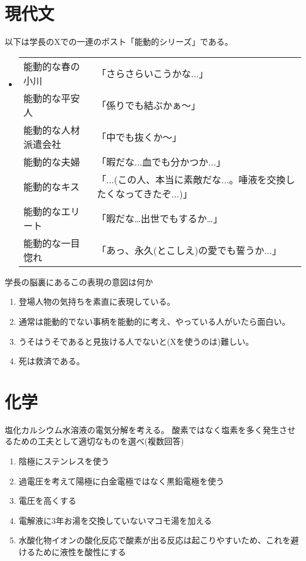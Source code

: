 \documentclass[uplatex]{jsarticle}
\begin{document}
\section{現代文}
以下は学長のXでの一連のポスト「能動的シリーズ」である。
\begin{itemize}[label={}]
    \item \begin{tabular}{ll}
        能動的な春の小川&「さらさらいこうかな...」 \\
        能動的な平安人&「係りでも結ぶかぁ～」 \\
        能動的な人材派遣会社&「中でも抜くか〜」 \\
        能動的な夫婦&「暇だな...血でも分かつか...」 \\
        能動的なキス&「...(この人、本当に素敵だな...。唾液を交換したくなってきたぞ...)」 \\
        能動的なエリート&「暇だな…出世でもするか…」 \\
        能動的な一目惚れ&「あっ、永久(とこしえ)の愛でも誓うか...」 \\
    \end{tabular}
\end{itemize}
学長の脳裏にあるこの表現の意図は何か
\begin{enumerate}
    \item 登場人物の気持ちを素直に表現している。
    \item 通常は能動的でない事柄を能動的に考え、やっている人がいたら面白い。
    \item うそはうそであると見抜ける人でないと(Xを使うのは)難しい。
    \item 死は救済である。
\end{enumerate}

\section{化学}
塩化カルシウム水溶液の電気分解を考える。
酸素ではなく塩素を多く発生させるための工夫として適切なものを選べ(複数回答)
\begin{enumerate}
    \item 陰極にステンレスを使う
    \item 過電圧を考えて陽極に白金電極ではなく黒鉛電極を使う
    \item 電圧を高くする
    \item 電解液に3年お湯を交換していないマコモ湯を加える
    \item 水酸化物イオンの酸化反応で酸素が出る反応は起こりやすいため、これを避けるために液性を酸性にする
\end{enumerate}
\end{document}
